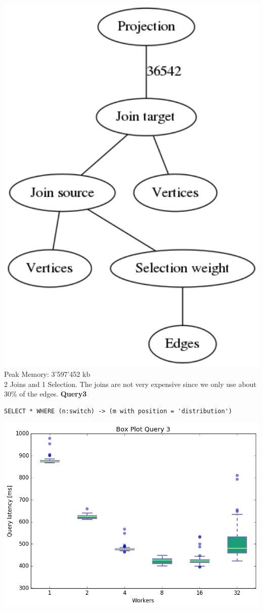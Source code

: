 \documentclass[11pt,singlecolumn]{scrartcl}
\begin{document}
\includegraphics[width=1\textwidth]{graph2}
Peak Memory: 3'597'452 kb \\
2 Joins and 1 Selection. The joins are not very expensive since we only use about 30\% of the edges.
\clearpage
\textbf{Query3}\\
\begin{verbatim}
SELECT * WHERE (n:switch) -> (m with position = 'distribution')\end{verbatim}
\includegraphics[width=1\textwidth]{box/q3}
\end{document}
